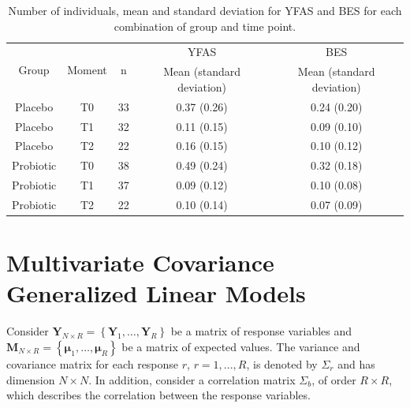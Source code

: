 \documentclass[Review,sagev,times, doublespace]{sagej}
\begin{document}
\begin{table}[h]
\centering
\begin{tabular}{ccccc}
\hline
\multirow{2}{*}{Group} & \multirow{2}{*}{Moment}  & \multirow{2}{*}{n} & YFAS                  & BES                   \\ \cline{4-5} 
                       &                          &                    & Mean (standard deviation) & Mean (standard deviation) \\ \hline
Placebo                & T0                       & 33                 & 0.37 (0.26)           & 0.24 (0.20)           \\
Placebo                & T1                       & 32                 & 0.11 (0.15)           & 0.09 (0.10)           \\
Placebo                & T2                       & 22                 & 0.16 (0.15)           & 0.10 (0.12)           \\
Probiotic              & T0                       & 38                 & 0.49 (0.24)           & 0.32 (0.18)           \\
Probiotic              & T1                       & 37                 & 0.09 (0.12)           & 0.10 (0.08)           \\
Probiotic              & T2                       & 22                 & 0.10 (0.14)           & 0.07 (0.09)           \\ \hline
\end{tabular}
\caption{Number of individuals, mean and standard deviation for YFAS and BES for each combination of group and time point.}
\label{tab:tab1}
\end{table}


\section{Multivariate Covariance Generalized Linear Models}\label{sec3}

Consider $\boldsymbol{Y}_{N \times R} = \left \{ \boldsymbol{Y}_1, \dots, \boldsymbol{Y}_R \right \}$ be a matrix of response variables and $\boldsymbol{ M}_{N \times R} = \left \{ \boldsymbol{\mu}_1, \dots, \boldsymbol{\mu}_R \right \}$ be a matrix of expected values. The variance and covariance matrix for each response $r$, $r = 1,..., R$, is denoted by $\Sigma_r$ and has dimension $N \times N$. In addition, consider a correlation matrix $\Sigma_b$, of order $R \times R$, which describes the correlation between the response variables.
\end{document}
